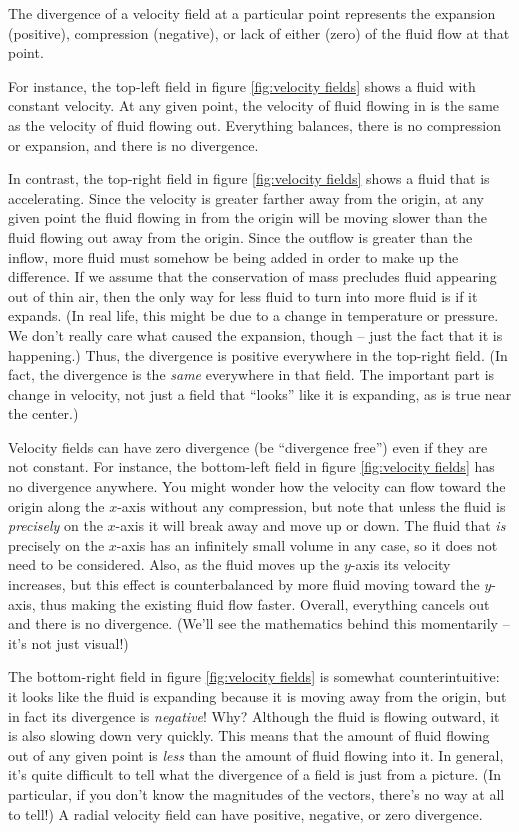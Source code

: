 \documentclass{myarticle}
\theoremstyle{nospace}
\newtheorem{old series theorem}{Theorem}
\newenvironment{series theorem}{\begin{mdframed}\begin{old series theorem}}{\end{old series theorem}\end{mdframed}}
\begin{document}
The divergence of a velocity field at a particular point represents the expansion (positive), compression (negative), or lack of either (zero) of the fluid flow at that point.

For instance, the top-left field in figure \ref{fig:velocity fields} shows a fluid with constant velocity. At any given point, the velocity of fluid flowing in is the same as the velocity of fluid flowing out. Everything balances, there is no compression or expansion, and there is no divergence.

In contrast, the top-right field in figure \ref{fig:velocity fields} shows a fluid that is accelerating. Since the velocity is greater farther away from the origin, at any given point the fluid flowing in from the origin will be moving slower than the fluid flowing out away from the origin. Since the outflow is greater than the inflow, more fluid must somehow be being added in order to make up the difference. If we assume that the conservation of mass precludes fluid appearing out of thin air, then the only way for less fluid to turn into more fluid is if it expands. (In real life, this might be due to a change in temperature or pressure. We don't really care what caused the expansion, though -- just the fact that it is happening.) Thus, the divergence is positive everywhere in the top-right field. (In fact, the divergence is the \textit{same} everywhere in that field. The important part is change in velocity, not just a field that ``looks'' like it is expanding, as is true near the center.)

Velocity fields can have zero divergence (be ``divergence free'') even if they are not constant. For instance, the bottom-left field in figure \ref{fig:velocity fields} has no divergence anywhere. You might wonder how the velocity can flow toward the origin along the $x$-axis without any compression, but note that unless the fluid is \textit{precisely} on the $x$-axis it will break away and move up or down. The fluid that \textit{is} precisely on the $x$-axis has an infinitely small volume in any case, so it does not need to be considered. Also, as the fluid moves up the $y$-axis its velocity increases, but this effect is counterbalanced by more fluid moving toward the $y$-axis, thus making the existing fluid flow faster. Overall, everything cancels out and there is no divergence. (We'll see the mathematics behind this momentarily -- it's not just visual!)

The bottom-right field in figure \ref{fig:velocity fields} is somewhat counterintuitive: it looks like the fluid is expanding because it is moving away from the origin, but in fact its divergence is \textit{negative}! Why? Although the fluid is flowing outward, it is also slowing down very quickly. This means that the amount of fluid flowing out of any given point is \textit{less} than the amount of fluid flowing into it. In general, it's quite difficult to tell what the divergence of a field is just from a picture. (In particular, if you don't know the magnitudes of the vectors, there's no way at all to tell!) A radial velocity field can have positive, negative, or zero divergence.
\end{document}
